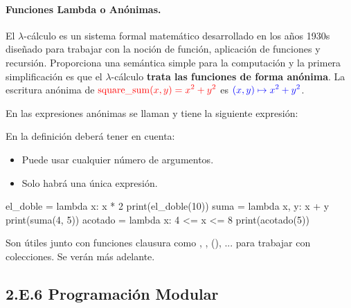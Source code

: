 \paragraph{Funciones Lambda o Anónimas.}

El $\lambda$-cálculo es un sistema formal matemático desarrollado en los años 1930s diseñado para trabajar con la noción de  función, aplicación de funciones y  recursión. Proporciona una semántica simple para la computación y la primera simplificación es que el $\lambda$-cálculo \textbf{trata las funciones de forma anónima}.
La escritura anónima de $\color{red}{\displaystyle \operatorname {square\_sum} (x,y)=x^{2}+y^{2}}$ es  $\color{blue}{\displaystyle (x,y)\mapsto x^{2}+y^{2}}$.


En  las expresiones anónimas se llaman  y
tiene la siguiente expresión: 

\centerline{}

En la definición deberá tener en cuenta:
	\begin{itemize}
	\item Puede usar cualquier número de argumentos.
	\item Solo habrá una única expresión.
	\end{itemize}
	

\hfil\begin{minipage}{.4\textwidth}
\begin{pyconsole}[][frame=single, fontsize=\footnotesize]
el_doble = lambda x: x * 2
print(el_doble(10))
suma = lambda x, y: x + y
print(suma(4, 5))
acotado = lambda x: 4 <= x <= 8
print(acotado(5))
\end{pyconsole}
\end{minipage}


Son útiles junto con funciones clausura como , , (), ... para trabajar con colecciones.  Se verán más adelante.







\subsection*{2.E.6 Programación Modular}




